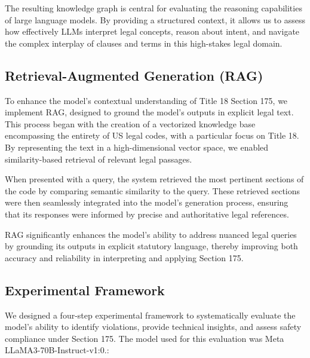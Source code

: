 \documentclass[letterpaper]{article} %
\begin{document}
The resulting knowledge graph is central for evaluating the reasoning capabilities of large language models. By providing a structured context, it allows us to assess how effectively LLMs interpret legal concepts, reason about intent, and navigate the complex interplay of clauses and terms in this high-stakes legal domain.

\subsection{Retrieval-Augmented Generation (RAG)} To enhance the model's contextual understanding of Title 18 Section 175, we implement RAG, designed to ground the model's outputs in explicit legal text. This process began with the creation of a vectorized knowledge base encompassing the entirety of US legal codes, with a particular focus on Title 18. By representing the text in a high-dimensional vector space, we enabled similarity-based retrieval of relevant legal passages.

When presented with a query, the system retrieved the most pertinent sections of the code by comparing semantic similarity to the query. These retrieved sections were then seamlessly integrated into the model's generation process, ensuring that its responses were informed by precise and authoritative legal references.

RAG significantly enhances the model's ability to address nuanced legal queries by grounding its outputs in explicit statutory language, thereby improving both accuracy and reliability in interpreting and applying Section 175.

\subsection{Experimental Framework} We designed a four-step experimental framework to systematically evaluate the model’s ability to identify violations, provide technical insights, and assess safety compliance under Section 175. The model used for this evaluation was Meta LLaMA3-70B-Instruct-v1:0.:
\end{document}
